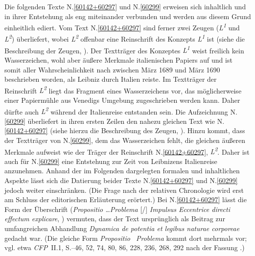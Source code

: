\footnotesize%
\pstart%
\noindent%
%
Die folgenden Texte N.\;\ref{60142+60297} und N.\;\ref{60299} erweisen sich inhaltlich und in ihrer Entstehung als eng miteinander verbunden und werden aus diesem Grund einheitlich ediert.
Vom Text N.\;\ref{60142+60297} sind ferner zwei Zeugen (\textit{L\textsuperscript{1}} und \textit{L\textsuperscript{2}}) überliefert, wobei \textit{L\textsuperscript{2}} offenbar eine Reinschrift des Konzepts \textit{L\textsuperscript{1}} ist (siehe die Beschreibung der Zeugen, ).
Der Textträger des Konzeptes \textit{L\textsuperscript{1}} weist freilich kein Wasserzeichen, wohl aber äußere Merkmale italienischen Papiers auf und ist somit aller Wahrscheinlichkeit nach zwischen März 1689 und März 1690 beschrieben worden, als Leibniz durch Italien reiste.
Im Textträger der Reinschrift \textit{L\textsuperscript{2}} liegt das Fragment eines Wasserzeichens vor, das möglicherweise einer Papiermühle aus Venedigs Umgebung zugeschrieben werden kann.
Daher dürfte auch \textit{L\textsuperscript{2}} während der Italienreise entstanden sein.
Die Aufzeichnung N.\;\ref{60299} überliefert in ihren ersten Zeilen den nahezu gleichen Text wie N.\;\ref{60142+60297} (siehe hierzu die Beschreibung des Zeugen, %
).
Hinzu kommt, dass der Textträger von N.\;\ref{60299}, dem das Wasserzeichen fehlt, die gleichen äußeren Merkmale aufweist wie der Träger der Reinschrift N.\;\ref{60142+60297}, \textit{L\textsuperscript{2}}.
Daher ist auch für N.\;\ref{60299} eine Entstehung zur Zeit von Leibnizens Italienreise anzunehmen.
Anhand der im Folgenden dargelegten formalen und inhaltlichen Aspekte lässt sich die Datierung beider Texte N.\;\ref{60142+60297} und 
N.\;\ref{60299} jedoch weiter einschränken.
(Die Frage nach der relativen Chronologie wird erst am Schluss der editorischen Erläuterung erörtert.)
\pend%
\pstart%
Bei N.\;\ref{60142+60297} lässt die Form der Überschrift (\textit{Propositio \dots Problema} [/] \textit{Impulsus Eccentrice directi effectum explicare}, ) vermuten, dass der Text ursprünglich als Beitrag zur umfangreichen Abhandlung \textit{Dynamica de potentia et legibus naturae corporeae} gedacht war.
(Die gleiche Form \textit{Propositio \textendash\ Problema} kommt dort mehrmals vor; vgl. etwa %
\textit{CFP}~II.1, S.--46, 52, 74, 80, 86, 228, 236, 268, 292 nach der Fassung .)\cite{01354}
